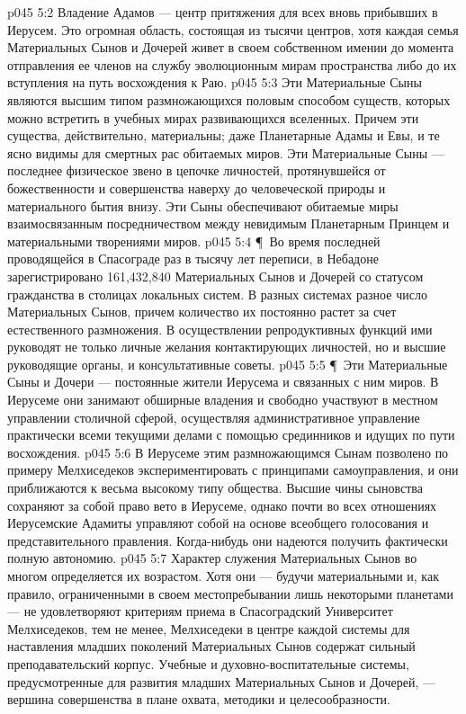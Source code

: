 \vs p045 5:2 Владение Адамов --- центр притяжения для всех вновь прибывших в Иерусем. Это огромная область, состоящая из тысячи центров, хотя каждая семья Материальных Сынов и Дочерей живет в своем собственном имении до момента отправления ее членов на службу эволюционным мирам пространства либо до их вступления на путь восхождения к Раю.
\vs p045 5:3 Эти Материальные Сыны являются высшим типом размножающихся половым способом существ, которых можно встретить в учебных мирах развивающихся вселенных. Причем эти существа, действительно, материальны; даже Планетарные Адамы и Евы, и те ясно видимы для смертных рас обитаемых миров. Эти Материальные Сыны --- последнее физическое звено в цепочке личностей, протянувшейся от божественности и совершенства наверху до человеческой природы и материального бытия внизу. Эти Сыны обеспечивают обитаемые миры взаимосвязанным посредничеством между невидимым Планетарным Принцем и материальными творениями миров.
\vs p045 5:4 \P\ Во время последней проводящейся в Спасограде раз в тысячу лет переписи, в Небадоне зарегистрировано 161,432,840 Материальных Сынов и Дочерей со статусом гражданства в столицах локальных систем. В разных системах разное число Материальных Сынов, причем количество их постоянно растет за счет естественного размножения. В осуществлении репродуктивных функций ими руководят не только личные желания контактирующих личностей, но и высшие руководящие органы, и консультативные советы.
\vs p045 5:5 \P\ Эти Материальные Сыны и Дочери --- постоянные жители Иерусема и связанных с ним миров. В Иерусеме они занимают обширные владения и свободно участвуют в местном управлении столичной сферой, осуществляя административное управление практически всеми текущими делами с помощью срединников и идущих по пути восхождения.
\vs p045 5:6 В Иерусеме этим размножающимся Сынам позволено по примеру Мелхиседеков экспериментировать с принципами самоуправления, и они приближаются к весьма высокому типу общества. Высшие чины сыновства сохраняют за собой право вето в Иерусеме, однако почти во всех отношениях Иерусемские Адамиты управляют собой на основе всеобщего голосования и представительного правления. Когда\hyp{}нибудь они надеются получить фактически полную автономию.
\vs p045 5:7 Характер служения Материальных Сынов во многом определяется их возрастом. Хотя они --- будучи материальными и, как правило, ограниченными в своем местопребывании лишь некоторыми планетами --- не удовлетворяют критериям приема в Спасоградский Университет Мелхиседеков, тем не менее, Мелхиседеки в центре каждой системы для наставления младших поколений Материальных Сынов содержат сильный преподавательский корпус. Учебные и духовно\hyp{}воспитательные системы, предусмотренные для развития младших Материальных Сынов и Дочерей, --- вершина совершенства в плане охвата, методики и целесообразности.
